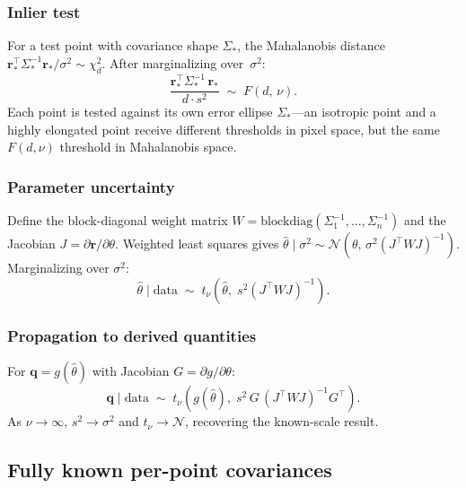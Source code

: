 \documentclass[11pt]{article}
\newcommand{\Normal}{\mathcal{N}}
\newcommand{\data}{\mathrm{data}}
\begin{document}
\subsubsection{Inlier test}

For a test point with covariance shape $\Sigma_*$, the Mahalanobis
distance $\mathbf{r}_*^\top \Sigma_*^{-1} \mathbf{r}_* / \sigma^2 \sim \chi^2_d$.
After marginalizing over~$\sigma^2$:
\begin{equation}
  \boxed{
    \frac{\mathbf{r}_*^\top \Sigma_*^{-1}\, \mathbf{r}_*}{d \cdot s^2}
    \;\sim\; F(d,\, \nu).
  }
\end{equation}
Each point is tested against its own error ellipse $\Sigma_*$---an isotropic
point and a highly elongated point receive different thresholds in pixel space,
but the same $F(d, \nu)$ threshold in Mahalanobis space.

\subsubsection{Parameter uncertainty}

Define the block-diagonal weight matrix
$W = \mathrm{blockdiag}(\Sigma_1^{-1}, \ldots, \Sigma_n^{-1})$
and the Jacobian $J = \partial \mathbf{r} / \partial \theta$.
Weighted least squares gives
$\hat\theta \mid \sigma^2 \sim
\Normal(\theta,\, \sigma^2 (J^\top W J)^{-1})$.
Marginalizing over $\sigma^2$:
\begin{equation}
  \boxed{
    \hat\theta \mid \data \;\sim\;
    t_\nu\!\left(\hat\theta,\; s^2 (J^\top W J)^{-1}\right).
  }
\end{equation}

\subsubsection{Propagation to derived quantities}

For $\mathbf{q} = g(\hat\theta)$ with Jacobian $G = \partial g / \partial \theta$:
\begin{equation}
  \boxed{
    \mathbf{q} \mid \data \;\sim\;
    t_\nu\!\left(g(\hat\theta),\;
      s^2\, G\, (J^\top W J)^{-1} G^\top\right).
  }
\end{equation}
As $\nu \to \infty$, $s^2 \to \sigma^2$ and $t_\nu \to \Normal$,
recovering the known-scale result.

\subsection{Fully known per-point covariances}
\label{sec:het-known}
\end{document}
